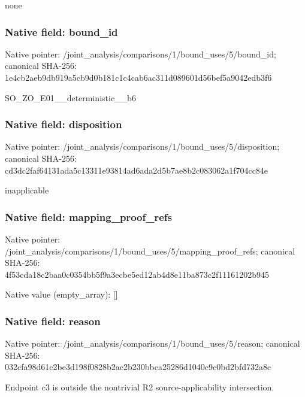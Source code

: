 \documentclass[10pt,a4paper]{article}
\begin{document}
\begingroup\raggedright\sloppy none\par\endgroup

\subsubsection{Native field: bound\_\allowbreak{}id}
Native pointer: /joint\_\allowbreak{}analysis/comparisons/1/bound\_\allowbreak{}uses/5/bound\_\allowbreak{}id; canonical SHA-256: 1e4cb2aeb9db919a5cb9d0b181c1c4cab6ac311d089601d56bef5a9042edb3f6

\begingroup\raggedright\sloppy SO\_\allowbreak{}ZO\_\allowbreak{}E01\_\allowbreak{}\_\allowbreak{}deterministic\_\allowbreak{}\_\allowbreak{}b6\par\endgroup

\subsubsection{Native field: disposition}
Native pointer: /joint\_\allowbreak{}analysis/comparisons/1/bound\_\allowbreak{}uses/5/disposition; canonical SHA-256: cd3dc2faf64131ada5c13311e93814ad6ada2d5b7ae8b2c083062a1f704cc84e

\begingroup\raggedright\sloppy inapplicable\par\endgroup

\subsubsection{Native field: mapping\_\allowbreak{}proof\_\allowbreak{}refs}
Native pointer: /joint\_\allowbreak{}analysis/comparisons/1/bound\_\allowbreak{}uses/5/mapping\_\allowbreak{}proof\_\allowbreak{}refs; canonical SHA-256: 4f53cda18c2baa0c0354bb5f9a3ecbe5ed12ab4d8e11ba873c2f11161202b945

Native value (empty\_\allowbreak{}array): []

\subsubsection{Native field: reason}
Native pointer: /joint\_\allowbreak{}analysis/comparisons/1/bound\_\allowbreak{}uses/5/reason; canonical SHA-256: 032cfa98d61c2be3d198f0828b2ac2b230bbca25286d1040c9c0bd2bfd732a8c

\begingroup\raggedright\sloppy Endpoint c3 is outside the nontrivial R2 source-applicability intersection.\par\endgroup
\end{document}
